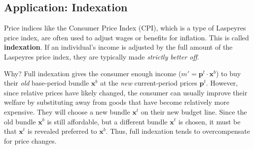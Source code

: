 \subsection{Application: Indexation}
Price indices like the Consumer Price Index (CPI), which is a type of Laspeyres price index, are often used to adjust wages or benefits for inflation. This is called \textbf{indexation}. If an individual's income is adjusted by the full amount of the Laspeyres price index, they are typically made \textit{strictly better off}.

Why? Full indexation gives the consumer enough income (\(m' = \mathbf{p}^t \cdot \mathbf{x}^b\)) to buy their \textit{old} base-period bundle \(\mathbf{x}^b\) at the \textit{new} current-period prices \(\mathbf{p}^t\). However, since relative prices have likely changed, the consumer can usually improve their welfare by substituting away from goods that have become relatively more expensive. They will choose a new bundle \(\mathbf{x}^t\) on their new budget line. Since the old bundle \(\mathbf{x}^b\) is still affordable, but a different bundle \(\mathbf{x}^t\) is chosen, it must be that \(\mathbf{x}^t\) is revealed preferred to \(\mathbf{x}^b\). Thus, full indexation tends to overcompensate for price changes.